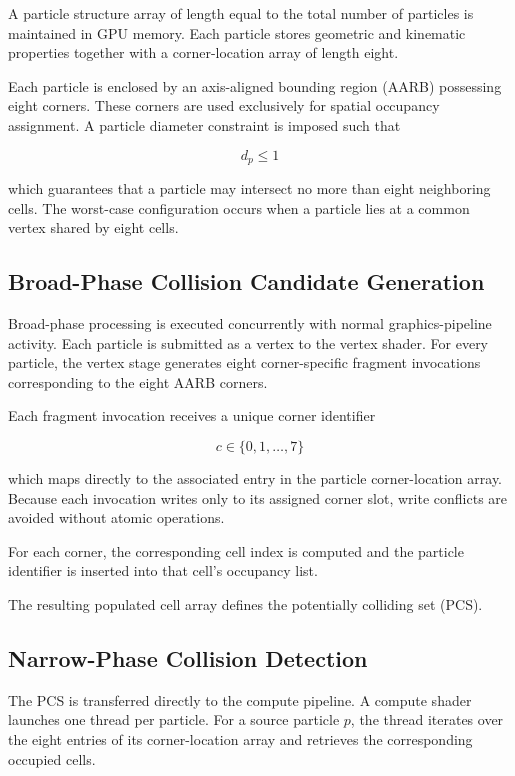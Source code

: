 A particle structure array of length equal to the total number of particles is maintained in GPU memory. Each particle stores geometric and kinematic properties together with a corner-location array of length eight.

Each particle is enclosed by an axis-aligned bounding region (AARB) possessing eight corners. These corners are used exclusively for spatial occupancy assignment. A particle diameter constraint is imposed such that

\[
d_p \leq 1
\]

which guarantees that a particle may intersect no more than eight neighboring cells. The worst-case configuration occurs when a particle lies at a common vertex shared by eight cells.

\subsection{Broad-Phase Collision Candidate Generation}

Broad-phase processing is executed concurrently with normal graphics-pipeline activity. Each particle is submitted as a vertex to the vertex shader. For every particle, the vertex stage generates eight corner-specific fragment invocations corresponding to the eight AARB corners.

Each fragment invocation receives a unique corner identifier

\[
c \in \{0,1,\dots,7\}
\]

which maps directly to the associated entry in the particle corner-location array. Because each invocation writes only to its assigned corner slot, write conflicts are avoided without atomic operations.

For each corner, the corresponding cell index is computed and the particle identifier is inserted into that cell's occupancy list. 

The resulting populated cell array defines the potentially colliding set (PCS).

\subsection{Narrow-Phase Collision Detection}

The PCS is transferred directly to the compute pipeline. A compute shader launches one thread per particle. For a source particle $p$, the thread iterates over the eight entries of its corner-location array and retrieves the corresponding occupied cells.


